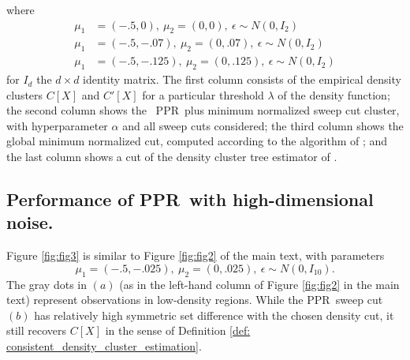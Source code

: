 \documentclass[11pt,twoside]{article}
\newcommand{\1}{\mathbf{1}}
\newcommand{\Xbf}{X}             %
\newcommand{\pprspace}{{\sc PPR~}}
\begin{document}
where 
\begin{align*}
\mu_1 & = (-.5, 0),~ \mu_2 = (0,0),~ \epsilon \sim N(0, I_2) \tag{row 1} \\
\mu_1 & = (-.5, -.07),~ \mu_2 = (0,.07),~ \epsilon \sim N(0, I_2) \tag{row 2} \\
\mu_1 & = (-.5, -.125),~ \mu_2 = (0,.125),~ \epsilon \sim N(0, I_2) \tag{row 3} 
\end{align*}
for $I_d$ the $d \times d$ identity matrix. The first column consists of the empirical density clusters $C[\Xbf]$ and $C'[\Xbf]$ for a particular threshold $\lambda$ of the density function; the second column shows the ~\pprspace plus minimum normalized sweep cut cluster, with hyperparameter $\alpha$ and all sweep cuts considered; the third column shows the global minimum normalized cut, computed according to the algorithm of \cite{szlam2010}; and the last column shows a cut of the density cluster tree estimator of \cite{chaudhuri2010}.

\subsection{Performance of \pprspace with high-dimensional noise.}

Figure \ref{fig:fig3} is similar to Figure \ref{fig:fig2} of the main text, with parameters
\begin{equation*}
\mu_1 = (-.5, -.025),~ \mu_2 = (0,.025),~ \epsilon \sim N(0, I_{10}).
\end{equation*}
The gray dots in $(a)$ (as in the left-hand column of Figure \ref{fig:fig2} in the main text) represent observations in low-density regions. While the \pprspace sweep cut $(b)$ has relatively high symmetric set difference with the chosen density cut, it still recovers $C[\Xbf]$ in the sense of Definition \ref{def: consistent_density_cluster_estimation}.
\end{document}
